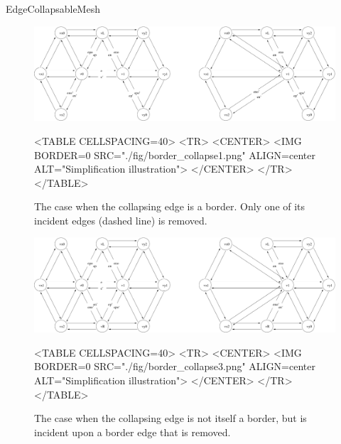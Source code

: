\begin{ccRefConcept}{EdgeCollapsableMesh}
\begin{figure}[htbp]
\begin{ccTexOnly}
\begin{center}
\includegraphics[width=17cm]{Surface_mesh_simplification_ref/fig/border_collapse1} %
\end{center}
\end{ccTexOnly}
\begin{ccHtmlOnly}
<TABLE CELLSPACING=40>
<TR>
<CENTER>
<IMG BORDER=0 SRC="./fig/border_collapse1.png" ALIGN=center ALT="Simplification illustration">
</CENTER>
</TR>
</TABLE>
\end{ccHtmlOnly}
\caption{The case when the collapsing edge is a border. Only one of its incident edges (dashed line) is removed.}
\end{figure}

\begin{figure}[htbp]
\begin{ccTexOnly}
\begin{center}
\includegraphics[width=17cm]{Surface_mesh_simplification_ref/fig/border_collapse3} %
\end{center}
\end{ccTexOnly}
\begin{ccHtmlOnly}
<TABLE CELLSPACING=40>
<TR>
<CENTER>
<IMG BORDER=0 SRC="./fig/border_collapse3.png" ALIGN=center ALT="Simplification illustration">
</CENTER>
</TR>
</TABLE>
\end{ccHtmlOnly}
\caption{The case when the collapsing edge is not itself a border, but is incident upon a border edge that is removed.}
\end{figure}


\end{ccRefConcept}
